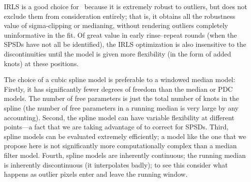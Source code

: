 \documentclass[letterpaper,12pt,preprint]{hack_aastex}
\newcommand{\Untrendy}{\package{Untrendy}}
\begin{document}
IRLS is a good choice for \Untrendy\ because it is extremely robust to
outliers, but does not exclude them from consideration entirely; that is, it
obtains all the robustness value of sigma-clipping or medianing, without
rendering outliers completely uninformative in the fit.
Of great value in early rinse--repeat rounds (when the SPSDs have not all be identified),
the IRLS optimization is also insensitive to the
discontinuities until the model is given more flexibility (in the form of
added knots) at these positions.

The choice of a cubic spline model is
preferable to a windowed median model:
Firstly, it has significantly fewer degrees of freedom than the median or PDC models.
The number of free parameters is just the total number of knots
in the spline (the number of free parameters in a running median is
very large by any
accounting).
Second, the spline model can have variable flexibility at
different points---a fact that we are taking advantage of to correct for
SPSDs.
Third, spline models can be evaluated extremely efficiently; a model
like the one that we propose here is not significantly more computationally
complex than a median filter model.
Fourth, spline models are inherently continuous; the running median is
inherently discontinuous (it interpolates badly); to see this consider what
happens as outlier pixels enter and leave the running window.
\end{document}
